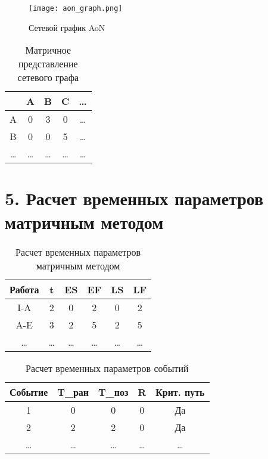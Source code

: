 \documentclass[12pt]{article}
\begin{document}
\begin{figure}[H]
    \centering
    \texttt{[image: aon\_graph.png]}
    \caption{Сетевой график AoN}
\end{figure}


\begin{table}[H]
    \centering
    \begin{tabular}{|c|c|c|c|c|}
        \hline
        & A & B & C & \ldots \\
        \hline
        A & 0 & 3 & 0 & \ldots \\
        \hline
        B & 0 & 0 & 5 & \ldots \\
        \hline
        \ldots & \ldots & \ldots & \ldots & \ldots \\
        \hline
    \end{tabular}
    \caption{Матричное представление сетевого графа}
\end{table}

\section*{5. Расчет временных параметров матричным методом}
\begin{table}[H]
    \centering
    \begin{tabular}{|c|c|c|c|c|c|}
        \hline
        Работа & t & ES & EF & LS & LF \\
        \hline
        I-A & 2 & 0 & 2 & 0 & 2 \\
        \hline
        A-E & 3 & 2 & 5 & 2 & 5 \\
        \hline
        \ldots & \ldots & \ldots & \ldots & \ldots & \ldots \\
        \hline
    \end{tabular}
    \caption{Расчет временных параметров матричным методом}
\end{table}


\begin{table}[H]
    \centering
    \begin{tabular}{|c|c|c|c|c|}
        \hline
        Событие & T\_ран & T\_поз & R & Крит. путь \\
        \hline
        1 & 0 & 0 & 0 & Да \\
        \hline
        2 & 2 & 2 & 0 & Да \\
        \hline
        \ldots & \ldots & \ldots & \ldots & \ldots \\
        \hline
    \end{tabular}
    \caption{Расчет временных параметров событий}
\end{table}
\end{document}
